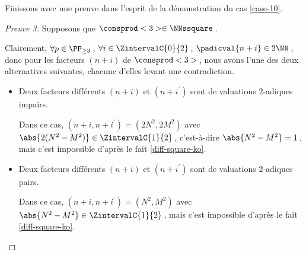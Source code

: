 

Finissons avec une preuve dans l'esprit de la démonstration du cas \ref{case-10}.


\begin{proof}[Preuve 3]%
    Supposons que $\consprod<3> \in \NNssquare$\,.
    
    \smallskip
    
    Clairement, 
    $\forall p \in \PP_{\geq 3}$\,, 
    $\forall i \in \ZintervalC{0}{2}$\,, 
    $\padicval{n + i} \in 2 \NN$\,,
    donc pour les facteurs $(n + i)$ de $\consprod<3>$\,, nous avons l'une des deux alternatives suivantes, chacune d'elles levant une contradiction.
    \begin{itemize}
    	\medskip
		\item Deux facteurs différents $(n+i)$ et $(n+i^\prime)$ sont de valuations $2$-adiques impairs.
		
		\smallskip
		\noindent
		Dans ce cas, $(n+i, n+i^\prime) = (2 N^2, 2 M^2)$ avec $\abs{2(N^2 - M^2)} \in \ZintervalC{1}{2}$\,, c'est-à-dire $\abs{N^2 - M^2} = 1$\,, mais c'est impossible d'après le fait \ref{diff-square-ko}.


    	\medskip
		\item Deux facteurs différents $(n+i)$ et $(n+i^\prime)$ sont de valuations $2$-adiques pairs.
		
		\smallskip
		\noindent
		Dans ce cas, $(n+i, n+i^\prime) = (N^2, M^2)$ avec $\abs{N^2 - M^2} \in \ZintervalC{1}{2}$\,, mais c'est impossible d'après le fait \ref{diff-square-ko}.
		\qedhere
    \end{itemize}
\end{proof}

